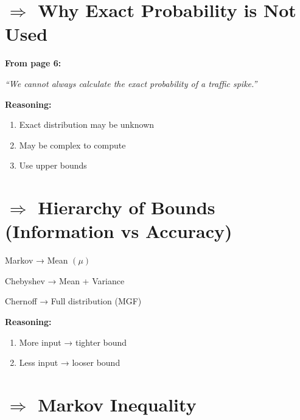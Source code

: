 \documentclass{article}
\begin{document}
\section*{$\Rightarrow$ Why Exact Probability is Not Used}

\textbf{From page 6:}

\begin{center}
\textit{``We cannot always calculate the exact probability of a traffic spike.''}
\end{center}

\vspace{0.2cm}

\textbf{Reasoning:}

\begin{enumerate}
\item Exact distribution may be unknown
\item May be complex to compute
\item Use upper bounds
\end{enumerate}

\vspace{0.6cm}


\section*{$\Rightarrow$ Hierarchy of Bounds (Information vs Accuracy)}

Markov → Mean $(\mu)$  

Chebyshev → Mean + Variance  

Chernoff → Full distribution (MGF)  

\vspace{0.2cm}

\textbf{Reasoning:}

\begin{enumerate}
\item More input → tighter bound
\item Less input → looser bound
\end{enumerate}

\vspace{0.6cm}


\section*{$\Rightarrow$ Markov Inequality}
\end{document}
